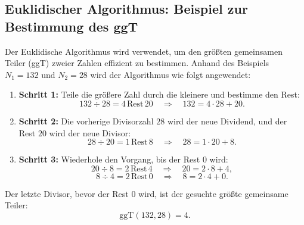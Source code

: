 \subsection{Euklidischer Algorithmus: Beispiel zur Bestimmung des ggT}

Der Euklidische Algorithmus wird verwendet, um den größten gemeinsamen 
Teiler (ggT) zweier Zahlen effizient zu bestimmen. Anhand des Beispiels 
$N_1 = 132$ und $N_2 = 28$ wird der Algorithmus wie folgt angewendet:

\begin{enumerate}
    \item \textbf{Schritt 1:}  
    Teile die größere Zahl durch die kleinere und bestimme den Rest:  
    \[
    132 \div 28 = 4 \, \text{Rest} \, 20 \quad \Rightarrow \quad 132 = 4 \cdot 28 + 20.
    \]

    \item \textbf{Schritt 2:}  
    Die vorherige Divisorzahl $28$ wird der neue Dividend, und der Rest $20$ wird der neue Divisor:  
    \[
    28 \div 20 = 1 \, \text{Rest} \, 8 \quad \Rightarrow \quad 28 = 1 \cdot 20 + 8.
    \]

    \item \textbf{Schritt 3:}  
    Wiederhole den Vorgang, bis der Rest $0$ wird:  
    \[
    20 \div 8 = 2 \, \text{Rest} \, 4 \quad \Rightarrow \quad 20 = 2 \cdot 8 + 4,
    \]  
    \[
    8 \div 4 = 2 \, \text{Rest} \, 0 \quad \Rightarrow \quad 8 = 2 \cdot 4 + 0.
    \]
\end{enumerate}

Der letzte Divisor, bevor der Rest $0$ wird, ist der gesuchte größte gemeinsame Teiler:  
\[
\text{ggT}(132, 28) = 4. 
\] \cite{euklid}


